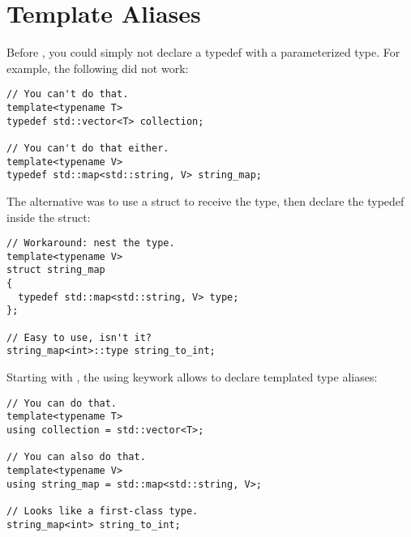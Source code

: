 \section{Template Aliases}

Before , you could simply not declare a typedef with a
parameterized type. For example, the following did not work:

\begin{lstlisting}
// You can't do that.
template<typename T>
typedef std::vector<T> collection;

// You can't do that either.
template<typename V>
typedef std::map<std::string, V> string_map;
\end{lstlisting}

The alternative was to use a struct to receive the type, then declare
the typedef inside the struct:

\begin{lstlisting}
// Workaround: nest the type.
template<typename V>
struct string_map
{
  typedef std::map<std::string, V> type;
};

// Easy to use, isn't it?
string_map<int>::type string_to_int;
\end{lstlisting}

Starting with , the using keywork allows to declare templated
type aliases:

\begin{lstlisting}
// You can do that.
template<typename T>
using collection = std::vector<T>;

// You can also do that.
template<typename V>
using string_map = std::map<std::string, V>;

// Looks like a first-class type.
string_map<int> string_to_int;
\end{lstlisting}

